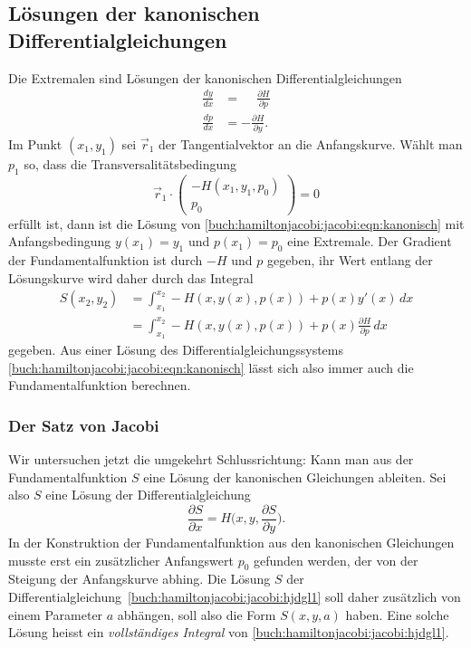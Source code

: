 %
%
\subsection{Lösungen der kanonischen Differentialgleichungen}
Die Extremalen sind Lösungen der kanonischen Differentialgleichungen
\begin{equation}
\begin{aligned}
\frac{dy}{dx}&=\phantom{-}\frac{\partial H}{\partial p}
\\
\frac{dp}{dx}&=-\frac{\partial H}{\partial y}.
\end{aligned}
\label{buch:hamiltonjacobi:jacobi:eqn:kanonisch}
\end{equation}
Im Punkt $(x_1,y_1)$ sei $\vec{r}_1$ der Tangentialvektor an die
Anfangskurve.
Wählt man $p_1$ so, dass die Transversalitätsbedingung
\[
\vec{r}_1
\cdot
\begin{pmatrix}
-H(x_1,y_1,p_0)\\
p_0
\end{pmatrix}
=
0
\]
erfüllt ist, dann ist die Lösung von
\eqref{buch:hamiltonjacobi:jacobi:eqn:kanonisch}
mit Anfangsbedingung $y(x_1)=y_1$ und $p(x_1)=p_0$ eine Extremale.
Der Gradient der Fundamentalfunktion ist durch $-H$ und $p$ gegeben,
ihr Wert entlang der Lösungskurve wird daher durch das Integral
\begin{align*}
S(x_2,y_2)
&=
\int_{x_1}^{x_2}
-H(x,y(x),p(x))
+
p(x) y'(x)
\,dx
\\
&=
\int_{x_1}^{x_2}
-H(x,y(x),p(x))
+
p(x)\frac{\partial H}{\partial p}
\,dx
\end{align*}
gegeben.
Aus einer Lösung des Differentialgleichungssystems
\eqref{buch:hamiltonjacobi:jacobi:eqn:kanonisch}
lässt sich also immer auch die Fundamentalfunktion berechnen.

%
%
\subsubsection{Der Satz von Jacobi}
Wir untersuchen jetzt die umgekehrt Schlussrichtung: Kann man aus
der Fundamentalfunktion $S$ eine Lösung der kanonischen Gleichungen 
ableiten.
Sei also $S$ eine Lösung der Differentialgleichung
\begin{equation}
\frac{\partial S}{\partial x}
=
H\biggl(x,y,\frac{\partial S}{\partial y}\biggr).
\label{buch:hamiltonjacobi:jacobi:hjdgl1}
\end{equation}
In der Konstruktion der Fundamentalfunktion aus den kanonischen Gleichungen
musste erst ein zusätzlicher Anfangswert $p_0$ gefunden werden,
der von der Steigung der Anfangskurve abhing.
Die Lösung $S$ der
Differentialgleichung~\eqref{buch:hamiltonjacobi:jacobi:hjdgl1}
soll daher zusätzlich von einem Parameter $a$ abhängen, soll also
die Form
\(
S(x,y,a)
\)
haben.
Eine solche Lösung heisst ein {\em vollständiges Integral} von
%
\eqref{buch:hamiltonjacobi:jacobi:hjdgl1}.

